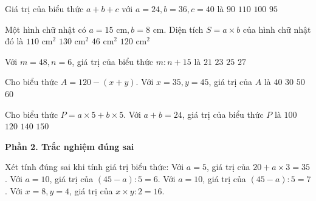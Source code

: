 \begin{ex} %
Giá trị của biểu thức $a + b + c$ với $a = 24, b = 36, c = 40$ là
\choice
{$90$}
{$110$}
{\True $100$}
{$95$}
\end{ex}

\begin{ex} %
Một hình chữ nhật có $a = 15\text{ cm}, b = 8\text{ cm}$. Diện tích $S = a \times b$ của hình chữ nhật đó là
\choice
{$110\text{ cm}^2$}
{$130\text{ cm}^2$}
{$46\text{ cm}^2$}
{\True $120\text{ cm}^2$}
\end{ex}

\begin{ex} %
Với $m = 48, n = 6$, giá trị của biểu thức $m : n + 15$ là
\choice
{$21$}
{\True $23$}
{$25$}
{$27$}
\end{ex}

\begin{ex} %
Cho biểu thức $A = 120 - (x + y)$. Với $x = 35, y = 45$, giá trị của $A$ là
\choice
{\True $40$}
{$30$}
{$50$}
{$60$}
\end{ex}

\begin{ex} %
Cho biểu thức $P = a \times 5 + b \times 5$. Với $a + b = 24$, giá trị của biểu thức $P$ là
\choice
{$100$}
{\True $120$}
{$140$}
{$150$}
\end{ex}

\textbf{Phần 2. Trắc nghiệm đúng sai}

\begin{ex} %
Xét tính đúng sai khi tính giá trị biểu thức:
\choiceTF
{\True Với $a = 5$, giá trị của $20 + a \times 3 = 35$.}
{Với $a = 10$, giá trị của $(45 - a) : 5 = 6$.}
{\True Với $a = 10$, giá trị của $(45 - a) : 5 = 7$.}
{\True Với $x = 8, y = 4$, giá trị của $x \times y : 2 = 16$.}
\end{ex}

